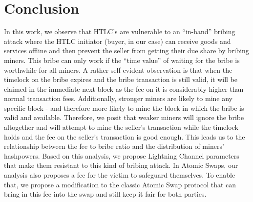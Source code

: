 \documentclass[runningheads]{llncs}
\begin{document}
\section{Conclusion}
In this work, we observe that HTLC's are vulnerable to an ``in-band'' bribing attack where the HTLC initiator (buyer, in our case) can receive goods and services offline and then prevent the seller from getting their due share by bribing miners. This bribe can only work if the ``time value'' of waiting for the bribe is worthwhile for all miners. A rather self-evident observation is that when the timelock on the bribe expires and the bribe transaction is still valid, it will be claimed in the immediate next block as the fee on it is considerably higher than normal transaction fees. Additionally, stronger miners are likely to mine any specific block - and therefore more likely to mine the block in which the bribe is valid and available. Therefore, we posit that weaker miners will ignore the bribe altogether and will attempt to mine the seller's transaction while the timelock holds and the fee on the seller's transaction is good enough. This leads us to the relationship between the fee to bribe ratio and the distribution of miners' hashpowers. Based on this analysis, we propose Lightning Channel parameters that make them resistant to this kind of bribing attack. In Atomic Swaps, our analysis also proposes a fee for the victim to safeguard themselves. To enable that, we propose a modification to the classic Atomic Swap protocol that can bring in this fee into the swap and still keep it fair for both parties.


\end{document}
